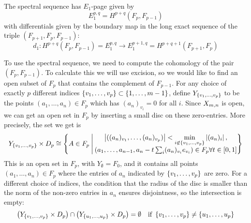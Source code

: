 The spectral sequence has $E_1$-page given by
\[ E_1^{p,q} = H^{p+q}(F_p,F_{p-1}) \]
with differentials given by the boundary map in the long exact
sequence of the triple $(F_{p+1},F_p,F_{p-1})$:
\[ d_1 : H^{p+q}(F_p,F_{p-1}) = E_1^{p,q} \to E_1^{p+1,q} =
H^{p+q+1}(F_{p+1},F_p) \]

To use the spectral sequence, we need to compute the cohomology of the
pair $(F_p,F_{p-1})$. To calculate this we will use excision, so we
would like to find an open subset of $F_p$ that contains the
complement of $F_{p-1}$. For any choice of exactly $p$ 
different indices $\left\{ v_1,\dots,v_p \right\}\subset \left\{ 1,\dots,m-1 \right\}$,
define $Y_{\left\{ v_1,\dots,v_p \right\}}$ to be the points $(a_1,\dots,a_n)\in
F_p$ which has $(a_n)_{v_i} = 0$ for all $i$. Since $X_{m,n}$ is open, we
can get an open set in $F_p$ by inserting a small disc on these
zero-entries. More precisely, the set we get is
\[ Y_{\left\{ v_1,\dots,v_p \right\}} \times D_p \cong \left\{  A\in F_p \:\Bigg\vert\: 
  \begin{matrix} \displaystyle 
    \left| ((a_n)_{v_1},\dots,(a_n)_{v_p}) \right| <
    \min_{i\not\in \left\{ v_1,\dots,v_p \right\}} \left| (a_n)_i \right|, \\
    \left(a_1,\dots,a_{n-1},a_n-t\sum_{i} (a_n)_{v_i}e_{v_i}\right)\in
    F_p \forall t \in [0,1]
  \end{matrix}  \right\} \]
This is an open set in $F_p$, with $Y_{\emptyset} = F_0$, and it
contains all points $(a_1,\dots,a_n)\in F_p$ where the entries of
$a_n$ indicated by $\left\{ v_1,\dots,v_p \right\}$ are zero. For a different
choice of indices, the condition that the radius of the disc is
smaller than the norm of the non-zero entries in $a_n$ ensures
disjointness, so the intersection is empty:
\[ \left(Y_{\left\{ v_1,\dots,v_p \right\}}\times D_p\right) \cap \left(
Y_{\left\{ u_1,\dots,u_p \right\}}\times D_p\right) = \emptyset \quad \text{if }
\left\{ v_1,\dots,v_p \right\} \neq \left\{ u_1,\dots,u_p \right\} \]

